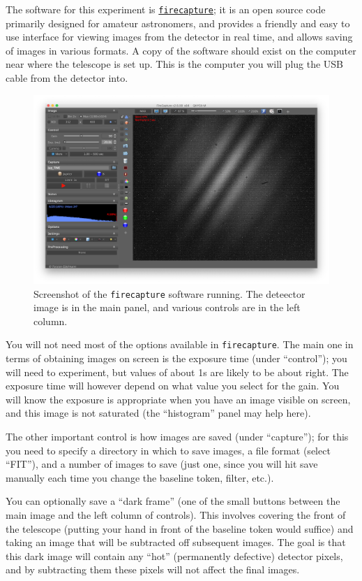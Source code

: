 \documentclass[11pt]{article}
\begin{document}
The software for this experiment is \href{http://www.firecapture.de/}{\texttt{firecapture}}; it is an open source code primarily designed for amateur astronomers, and provides a friendly and easy to use interface for viewing images from the detector in real time, and allows saving of images in various formats. A copy of the software should exist on the computer near where the telescope is set up. This is the computer you will plug the USB cable from the detector into.

\begin{figure}[h]
    \centering
    \includegraphics[width=1\textwidth]{doc/fc.png}
    \caption{Screenshot of the \texttt{firecapture} software running. The deteector image is in the main panel, and various controls are in the left column.}
    \label{fig:fc}
\end{figure}

You will not need most of the options available in \texttt{firecapture}. The main one in terms of obtaining images on screen is the exposure time (under ``control''); you will need to experiment, but values of about 1s are likely to be about right. The exposure time will however depend on what value you select for the gain. You will know the exposure is appropriate when you have an image visible on screen, and this image is not saturated (the ``histogram'' panel may help here).

The other important control is how images are saved (under ``capture''); for this you need to specify a directory in which to save images, a file format (select ``FIT''), and a number of images to save (just one, since you will hit save manually each time you change the baseline token, filter, etc.).

You can optionally save a ``dark frame'' (one of the small buttons between the main image and the left column of controls). This involves covering the front of the telescope (putting your hand in front of the baseline token would suffice) and taking an image that will be subtracted off subsequent images. The goal is that this dark image will contain any ``hot'' (permanently defective) detector pixels, and by subtracting them these pixels will not affect the final images.
\end{document}
